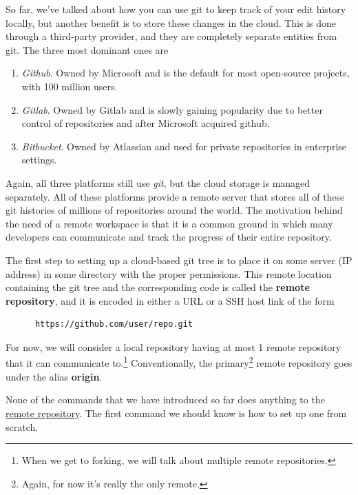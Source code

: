   So far, we've talked about how you can use git to keep track of your edit history locally, but another benefit is to store these changes in the cloud. This is done through a third-party provider, and they are completely separate entities from git. The three most dominant ones are  
  \begin{enumerate}
    \item \textit{Github}. Owned by Microsoft and is the default for most open-source projects, with 100 million users. 
    \item \textit{Gitlab}. Owned by Gitlab and is slowly gaining popularity due to better control of repositories and after Microsoft acquired github. 
    \item \textit{Bitbucket}. Owned by Atlassian and used for private repositories in enterprise settings. 
  \end{enumerate}
  Again, all three platforms still use \textit{git}, but the cloud storage is managed separately. All of these platforms provide a remote server that stores all of these git histories of millions of repositories around the world. The motivation behind the need of a remote workspace is that it is a common ground in which many developers can communicate and track the progress of their entire repository. 

  \begin{definition}
    \label{def:remote-repository}
    The first step to setting up a cloud-based git tree is to place it on some server (IP address) in some directory with the proper permissions. This remote location containing the git tree and the corresponding code is called the \textbf{remote repository}, and it is encoded in either a URL or a SSH host link of the form 
    \begin{lstlisting}
      https://github.com/user/repo.git
    \end{lstlisting} 
    For now, we will consider a local repository having at most 1 remote repository that it can communicate to.\footnote{When we get to forking, we will talk about multiple remote repositories.} Conventionally, the primary\footnote{Again, for now it's really the only remote.} remote repository goes under the alias \textbf{origin}. 
  \end{definition}  

  None of the commands that we have introduced so far does anything to the \hyperref[def:remote-repository]{remote repository}. The first command we should know is how to set up one from scratch. 

